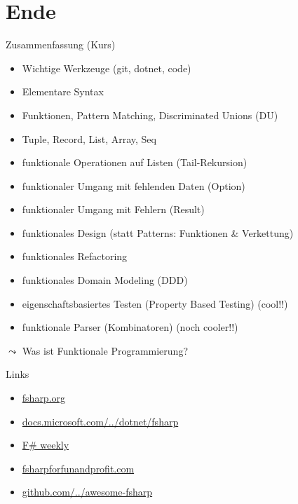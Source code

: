 \documentclass[t]{beamer}
\begin{document}
\section{Ende }
\label{sec:org1f0db14}
\begin{frame}[label={sec:org8b71561}]{Zusammenfassung (Kurs)}
\begin{itemize}
\item Wichtige Werkzeuge (git, dotnet, code)
\item Elementare Syntax
\item Funktionen, Pattern Matching, Discriminated Unions (DU)
\item Tuple, Record, List, Array, Seq
\item funktionale Operationen auf Listen (Tail-Rekursion)
\item funktionaler Umgang mit fehlenden Daten (Option)
\item funktionaler Umgang mit Fehlern (Result)
\item funktionales Design (statt Patterns: Funktionen \& Verkettung)
\item funktionales Refactoring
\item funktionales Domain Modeling (DDD)
\item eigenschaftsbasiertes Testen (Property Based Testing) (cool!!)
\item funktionale Parser (Kombinatoren) (noch cooler!!)
\end{itemize}
\(\leadsto\) \alert{\alert{Was ist Funktionale Programmierung?}}
\end{frame}

\begin{frame}[label={sec:orgb0480b3}]{Links}
\begin{itemize}
\item \href{https://fsharp.org/}{fsharp.org}
\item \href{https://docs.microsoft.com/de-de/dotnet/fsharp/}{docs.microsoft.com/../dotnet/fsharp}
\item \href{https://sergeytihon.com/}{F\# weekly}
\item \href{https://fsharpforfunandprofit.com/}{fsharpforfunandprofit.com}
\item \href{https://github.com/fsprojects/awesome-fsharp}{github.com/../awesome-fsharp}
\end{itemize}
\end{frame}
\end{document}
